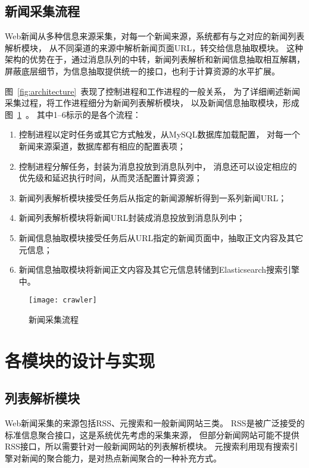 \subsection{新闻采集流程}
Web新闻从多种信息来源采集，对每一个新闻来源，系统都有与之对应的新闻列表解析模块，
从不同渠道的来源中解析新闻页面URL，转交给信息抽取模块。
这种架构的优势在于，通过消息队列的中转，新闻列表解析和新闻信息抽取相互解耦，
屏蔽底层细节，为信息抽取提供统一的接口，也利于计算资源的水平扩展。

图~\ref{fig:architecture}~表现了控制进程和工作进程的一般关系，
为了详细阐述新闻采集过程，将工作进程细分为新闻列表解析模块，
以及新闻信息抽取模块，形成图~\ref{fig:crawler}~。
其中1--6标示的是各个流程：
\begin{enumerate}
\item 控制进程以定时任务或其它方式触发，从MySQL数据库加载配置，
对每一个新闻来源渠道，数据库都有相应的配置表项；
\item 控制进程分解任务，封装为消息投放到消息队列中，
消息还可以设定相应的优先级和延迟执行时间，从而灵活配置计算资源；
\item 新闻列表解析模块接受任务后从指定的新闻源解析得到一系列新闻URL；
\item 新闻列表解析模块将新闻URL封装成消息投放到消息队列中；
\item 新闻信息抽取模块接受任务后从URL指定的新闻页面中，抽取正文内容及其它元信息；
\item 新闻信息抽取模块将新闻正文内容及其它元信息转储到Elasticsearch搜索引擎中。
\end{enumerate}

\begin{figure}[htbp]
\centering
\texttt{[image: crawler]}
\caption{新闻采集流程}
\label{fig:crawler}
\end{figure}

\section{各模块的设计与实现}
\label{sec:system-module}

\subsection{列表解析模块}
Web新闻采集的来源包括RSS、元搜索和一般新闻网站三类。
RSS是被广泛接受的标准信息聚合接口，这是系统优先考虑的采集来源，
但部分新闻网站可能不提供RSS接口，所以需要针对一般新闻网站的列表解析模块。
元搜索利用现有搜索引擎对新闻的聚合能力，是对热点新闻聚合的一种补充方式。

